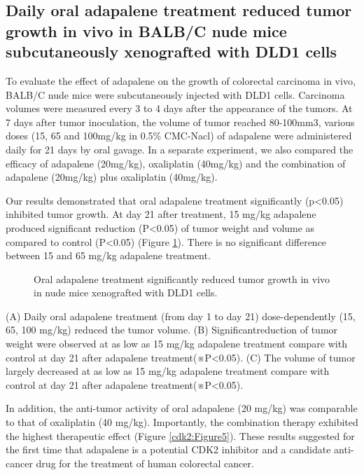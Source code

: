 \subsection{Daily oral adapalene treatment reduced tumor growth in vivo in BALB/C nude mice subcutaneously xenografted with DLD1 cells}

To evaluate the effect of adapalene on the growth of colorectal carcinoma in vivo, BALB/C nude mice were subcutaneously injected with DLD1 cells. Carcinoma volumes were measured every 3 to 4 days after the appearance of the tumors. At 7 days after tumor inoculation, the volume of tumor reached 80-100mm3, various doses (15, 65 and 100mg/kg in 0.5\% CMC-Nacl) of adapalene were administered daily for 21 days by oral gavage. In a separate experiment, we also compared the efficacy of adapalene (20mg/kg), oxaliplatin (40mg/kg) and the combination of adapalene (20mg/kg) plus oxaliplatin (40mg/kg).

Our results demonstrated that oral adapalene treatment significantly (p<0.05) inhibited tumor growth. At day 21 after treatment, 15 mg/kg adapalene produced significant reduction (P<0.05) of tumor weight and volume as compared to control (P<0.05) (Figure \ref{cdk2:Figure4}). There is no significant difference between 15 and 65 mg/kg adapalene treatment.

\begin{figure}
\centering
\caption{Oral adapalene treatment significantly reduced tumor growth in vivo in nude mice xenografted with DLD1 cells.}
\label{cdk2:Figure4}
\end{figure}
(A) Daily oral adapalene treatment (from day 1 to day 21) dose-dependently (15, 65, 100 mg/kg) reduced the tumor volume. (B) Significantreduction of tumor weight were observed at as low as 15 mg/kg adapalene treatment compare with control at day 21 after adapalene treatment(※P<0.05). (C) The volume of tumor largely decreased at as low as 15 mg/kg adapalene treatment compare with control at day 21 after adapalene treatment(※P<0.05).

In addition, the anti-tumor activity of oral adapalene (20 mg/kg) was comparable to that of oxaliplatin (40 mg/kg). Importantly, the combination therapy exhibited the highest therapeutic effect (Figure \ref{cdk2:Figure5}). These results suggested for the first time that adapalene is a potential CDK2 inhibitor and a candidate anti-cancer drug for the treatment of human colorectal cancer.

